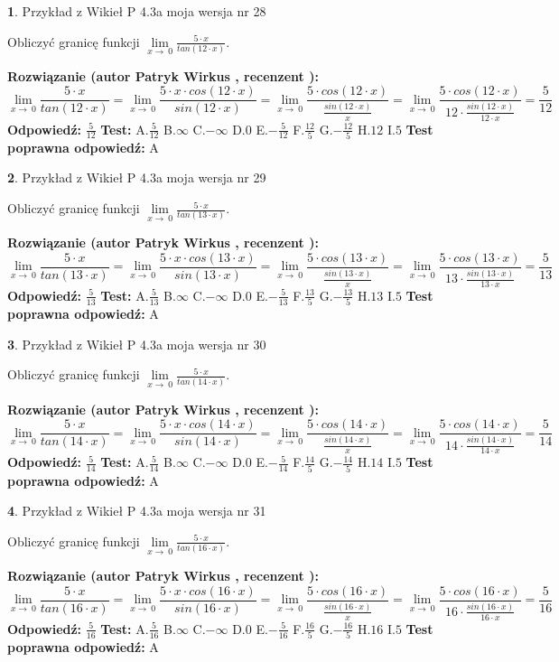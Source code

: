 \documentclass[12pt, a4paper]{article}
\theoremstyle{definition} %
\newtheorem{zad}{}
\newcommand{\zadStart}[1]{\begin{zad}#1\newline}
\newcommand{\zadStop}{\end{zad}}
\newcommand{\rozwStart}[2]{\noindent \textbf{Rozwiązanie (autor #1 , recenzent #2): }\newline}
\newcommand{\rozwStop}{\newline}
\newcommand{\odpStart}{\noindent \textbf{Odpowiedź:}\newline}
\newcommand{\odpStop}{\newline}
\newcommand{\testStart}{\noindent \textbf{Test:}\newline}
\newcommand{\testStop}{\newline}
\newcommand{\kluczStart}{\noindent \textbf{Test poprawna odpowiedź:}\newline}
\newcommand{\kluczStop}{\newline}
\begin{document}
\zadStart{Przykład z Wikieł P 4.3a moja wersja nr 28}


Obliczyć granicę funkcji $\lim\limits_{x\to\ 0}\frac{5 \cdot x}{tan(12 \cdot x)}$.
\zadStop
\rozwStart{Patryk Wirkus}{}
$$\lim\limits_{x\to\ 0}\frac{5 \cdot x}{tan(12 \cdot x)}=\lim\limits_{x\to\ 0}\frac{5 \cdot x \cdot cos(12 \cdot x)}{sin(12 \cdot x)}=\lim\limits_{x\to\ 0}\frac{5 \cdot cos(12 \cdot x)}{\frac{sin(12 \cdot x)}{x}}=\lim\limits_{x\to\ 0}\frac{5 \cdot cos(12 \cdot x)}{12 \cdot \frac{sin(12 \cdot x)}{12 \cdot x}} = \frac{5}{12}$$
\rozwStop
\odpStart
$\frac{5}{12}$
\odpStop
\testStart
A.$\frac{5}{12}$
B.$\infty$
C.$-\infty$
D.$0$
E.$-\frac{5}{12}$
F.$\frac{12}{5}$
G.$-\frac{12}{5}$
H.$12$
I.$5$
\testStop
\kluczStart
A
\kluczStop



\zadStart{Przykład z Wikieł P 4.3a moja wersja nr 29}


Obliczyć granicę funkcji $\lim\limits_{x\to\ 0}\frac{5 \cdot x}{tan(13 \cdot x)}$.
\zadStop
\rozwStart{Patryk Wirkus}{}
$$\lim\limits_{x\to\ 0}\frac{5 \cdot x}{tan(13 \cdot x)}=\lim\limits_{x\to\ 0}\frac{5 \cdot x \cdot cos(13 \cdot x)}{sin(13 \cdot x)}=\lim\limits_{x\to\ 0}\frac{5 \cdot cos(13 \cdot x)}{\frac{sin(13 \cdot x)}{x}}=\lim\limits_{x\to\ 0}\frac{5 \cdot cos(13 \cdot x)}{13 \cdot \frac{sin(13 \cdot x)}{13 \cdot x}} = \frac{5}{13}$$
\rozwStop
\odpStart
$\frac{5}{13}$
\odpStop
\testStart
A.$\frac{5}{13}$
B.$\infty$
C.$-\infty$
D.$0$
E.$-\frac{5}{13}$
F.$\frac{13}{5}$
G.$-\frac{13}{5}$
H.$13$
I.$5$
\testStop
\kluczStart
A
\kluczStop



\zadStart{Przykład z Wikieł P 4.3a moja wersja nr 30}


Obliczyć granicę funkcji $\lim\limits_{x\to\ 0}\frac{5 \cdot x}{tan(14 \cdot x)}$.
\zadStop
\rozwStart{Patryk Wirkus}{}
$$\lim\limits_{x\to\ 0}\frac{5 \cdot x}{tan(14 \cdot x)}=\lim\limits_{x\to\ 0}\frac{5 \cdot x \cdot cos(14 \cdot x)}{sin(14 \cdot x)}=\lim\limits_{x\to\ 0}\frac{5 \cdot cos(14 \cdot x)}{\frac{sin(14 \cdot x)}{x}}=\lim\limits_{x\to\ 0}\frac{5 \cdot cos(14 \cdot x)}{14 \cdot \frac{sin(14 \cdot x)}{14 \cdot x}} = \frac{5}{14}$$
\rozwStop
\odpStart
$\frac{5}{14}$
\odpStop
\testStart
A.$\frac{5}{14}$
B.$\infty$
C.$-\infty$
D.$0$
E.$-\frac{5}{14}$
F.$\frac{14}{5}$
G.$-\frac{14}{5}$
H.$14$
I.$5$
\testStop
\kluczStart
A
\kluczStop



\zadStart{Przykład z Wikieł P 4.3a moja wersja nr 31}


Obliczyć granicę funkcji $\lim\limits_{x\to\ 0}\frac{5 \cdot x}{tan(16 \cdot x)}$.
\zadStop
\rozwStart{Patryk Wirkus}{}
$$\lim\limits_{x\to\ 0}\frac{5 \cdot x}{tan(16 \cdot x)}=\lim\limits_{x\to\ 0}\frac{5 \cdot x \cdot cos(16 \cdot x)}{sin(16 \cdot x)}=\lim\limits_{x\to\ 0}\frac{5 \cdot cos(16 \cdot x)}{\frac{sin(16 \cdot x)}{x}}=\lim\limits_{x\to\ 0}\frac{5 \cdot cos(16 \cdot x)}{16 \cdot \frac{sin(16 \cdot x)}{16 \cdot x}} = \frac{5}{16}$$
\rozwStop
\odpStart
$\frac{5}{16}$
\odpStop
\testStart
A.$\frac{5}{16}$
B.$\infty$
C.$-\infty$
D.$0$
E.$-\frac{5}{16}$
F.$\frac{16}{5}$
G.$-\frac{16}{5}$
H.$16$
I.$5$
\testStop
\kluczStart
A
\kluczStop
\end{document}
